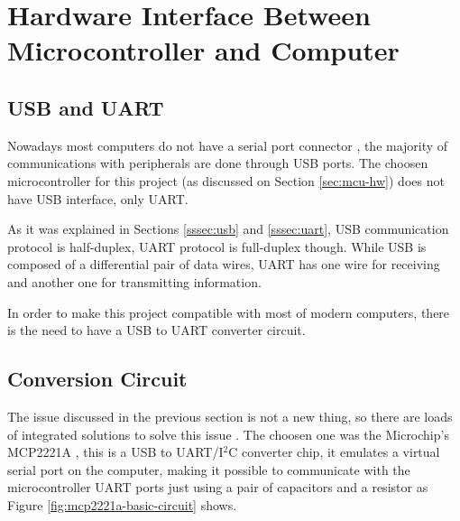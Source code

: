 \section{Hardware Interface Between Microcontroller and Computer}\label{sec:hardware-interface-between-mcu-and-computer}

	\subsection{USB and UART}\label{ssec:usb-and-uart}
		Nowadays most computers do not have a serial port connector \cite{serialPortNeverSayDie}, the majority of communications with peripherals are done through USB ports. The choosen microcontroller for this project (as discussed on Section \ref{sec:mcu-hw}) does not have USB interface, only UART. 

		As it was explained in Sections \ref{sssec:usb} and \ref{sssec:uart}, USB communication protocol is half-duplex, UART protocol is full-duplex though. While USB is composed of a differential pair of data wires, UART has one wire for receiving and another one for transmitting information. 

		In order to make this project compatible with most of modern computers, there is the need to have a USB to UART converter circuit.

	\subsection{Conversion Circuit}\label{ssec:usb-uart-conversion-circuit}

		The issue discussed in the previous section is not a new thing, so there are loads of integrated solutions to solve this issue \cite{usbSerialAdapter}. The choosen one was the Microchip's MCP2221A \cite{mcp2221a-datasheet}, this is a USB to UART/I$^2$C converter chip, it emulates a virtual serial port on the computer, making it possible to communicate with the microcontroller UART ports just using a pair of capacitors and a resistor as Figure \ref{fig:mcp2221a-basic-circuit} shows.


